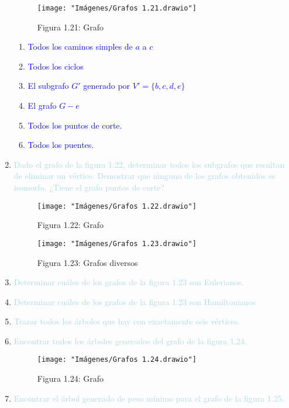 \documentclass[12pt]{article}
\newcommand{\lb}[1]{\textcolor{lightblue}{#1}}
\newcommand{\db}[1]{\textcolor{blue}{#1}}
\begin{document}
\begin{enumerate}[label=\color{red}\textbf{\arabic*)},leftmargin=*]
	\begin{figure}[h]
		\centering
		\texttt{[image: "Imágenes/Grafos 1.21.drawio"]}
		\caption*{Figura 1.21: Grafo}
	\end{figure}
	\begin{enumerate}[label=\color{red}\alph*)]
		\item \db{Todos los caminos simples de $a$ a $c$}
		\item \db{Todos los ciclos}
		\item \db{El subgrafo $G'$ generado por $V'=\{b,c,d,e\}$}
		\item \db{El grafo $G-e$}
		\item \db{Todos los puntos de corte.}
		\item \db{Todos los puentes.}
	\end{enumerate}
	\item \lb{Dado  el grafo de la figura 1.22, determinar todos los subgrafos que resultan de eliminar un vértice. Demostrar que ninguno de los grafos obtenidos es isomorfo. ¿Tiene el grafo puntos de corte?}
	\begin{figure}[h]
		\centering
		\texttt{[image: "Imágenes/Grafos 1.22.drawio"]}
		\caption*{Figura 1.22: Grafo}
	\end{figure}
	
	\begin{figure}[h]
		\centering
		\texttt{[image: "Imágenes/Grafos 1.23.drawio"]}
		\caption*{Figura 1.23: Grafos diversos}
	\end{figure}
	\item \lb{Determinar cuáles de los grafos de la figura 1.23 son Eulerianos.}
	\item \lb{Determinar cuáles de los grafos de la figura 1.23 son Hamiltonianos}
	\item \lb{Trazar todos los árboles que hay con exactamente seis vértices.}
	\item \lb{Encontrar todos los árboles generados del grafo de la figura 1.24.}
	
	\begin{figure}[h]
		\centering
		\texttt{[image: "Imágenes/Grafos 1.24.drawio"]}
		\caption*{Figura 1.24: Grafo}
	\end{figure}
	\item \lb{Encontrar el árbol generado de peso mínimo para el grafo de la figura 1.25.}
	

\end{enumerate}
\end{document}
